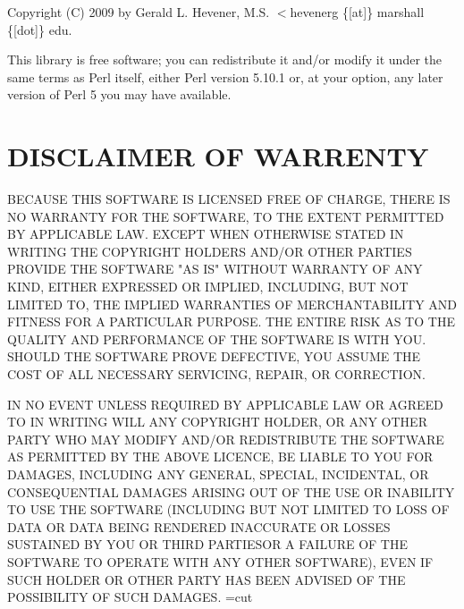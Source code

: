 Copyright (C) 2009 by Gerald L. Hevener, M.S. $<$hevenerg \{[at]\} marshall \{[dot]\} edu.



This library is free software; you can redistribute it and/or modify
it under the same terms as Perl itself, either Perl version 5.10.1 or,
at your option, any later version of Perl 5 you may have available.

\section{DISCLAIMER OF WARRENTY\label{DISCLAIMER_OF_WARRENTY}}


BECAUSE THIS SOFTWARE IS LICENSED FREE OF CHARGE, THERE IS NO WARRANTY FOR THE SOFTWARE, TO THE EXTENT PERMITTED BY APPLICABLE LAW. EXCEPT WHEN OTHERWISE STATED IN WRITING THE COPYRIGHT HOLDERS AND/OR OTHER PARTIES PROVIDE THE SOFTWARE "AS IS" WITHOUT WARRANTY OF ANY KIND, EITHER EXPRESSED OR IMPLIED, INCLUDING, BUT NOT LIMITED TO, THE IMPLIED WARRANTIES OF MERCHANTABILITY AND FITNESS FOR A PARTICULAR PURPOSE. THE ENTIRE RISK AS TO THE QUALITY AND PERFORMANCE OF THE SOFTWARE IS WITH YOU. SHOULD THE SOFTWARE PROVE DEFECTIVE, YOU ASSUME THE COST OF ALL NECESSARY SERVICING, REPAIR, OR CORRECTION.



IN NO EVENT UNLESS REQUIRED BY APPLICABLE LAW OR AGREED TO IN WRITING WILL ANY COPYRIGHT HOLDER, OR ANY OTHER PARTY WHO MAY MODIFY AND/OR REDISTRIBUTE THE SOFTWARE AS PERMITTED BY THE ABOVE LICENCE, BE LIABLE TO YOU FOR DAMAGES, INCLUDING ANY GENERAL, SPECIAL, INCIDENTAL, OR CONSEQUENTIAL DAMAGES ARISING OUT OF THE USE OR INABILITY TO USE THE SOFTWARE (INCLUDING BUT NOT LIMITED TO LOSS OF DATA OR DATA BEING RENDERED INACCURATE OR LOSSES SUSTAINED BY YOU OR THIRD PARTIESOR A FAILURE OF THE SOFTWARE TO OPERATE WITH ANY OTHER SOFTWARE), EVEN IF SUCH HOLDER OR OTHER PARTY HAS BEEN ADVISED OF THE POSSIBILITY OF SUCH DAMAGES.
=cut

